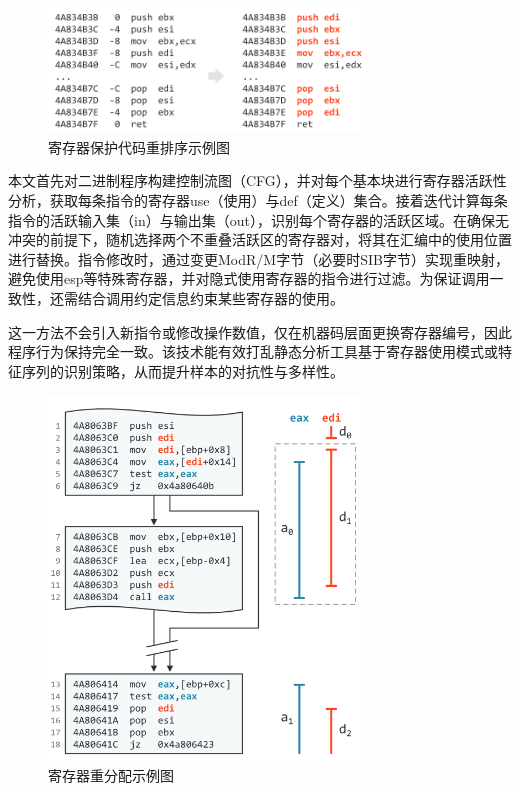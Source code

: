\begin{figure}[hbt]
	\centering
	\includegraphics[width=0.75\textwidth]{figures/4.5}
	\caption{寄存器保护代码重排序示例图}\label{fig:4.5}
\end{figure}

本文首先对二进制程序构建控制流图（CFG），并对每个基本块进行寄存器活跃性分析，获取每条指令的寄存器use（使用）与def（定义）集合。接着迭代计算每条指令的活跃输入集（in）与输出集（out），识别每个寄存器的活跃区域。在确保无冲突的前提下，随机选择两个不重叠活跃区的寄存器对，将其在汇编中的使用位置进行替换。指令修改时，通过变更ModR/M字节（必要时SIB字节）实现重映射，避免使用esp等特殊寄存器，并对隐式使用寄存器的指令进行过滤。为保证调用一致性，还需结合调用约定信息约束某些寄存器的使用。

这一方法不会引入新指令或修改操作数值，仅在机器码层面更换寄存器编号，因此程序行为保持完全一致。该技术能有效打乱静态分析工具基于寄存器使用模式或特征序列的识别策略，从而提升样本的对抗性与多样性。

\begin{figure}[hbt]
	\centering
	\includegraphics[width=0.75\textwidth]{figures/4.6}
	\caption{寄存器重分配示例图}\label{fig:4.6}
\end{figure}

